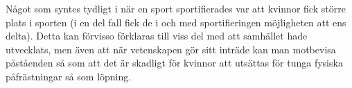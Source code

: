 \documentclass[12pt,a4paper]{article}
\begin{document}
Något som syntes tydligt i när en sport sportifierades var att kvinnor fick större plats i sporten (i en del fall fick de i och med sportifieringen möjligheten att ens delta).
Detta kan förvisso förklaras till viss del med att samhället hade utvecklats, men även att när vetenskapen gör sitt inträde kan man motbevisa påståenden så som att det är skadligt för kvinnor att utsättas för tunga fysiska påfrästningar så som löpning.
\end{document}
